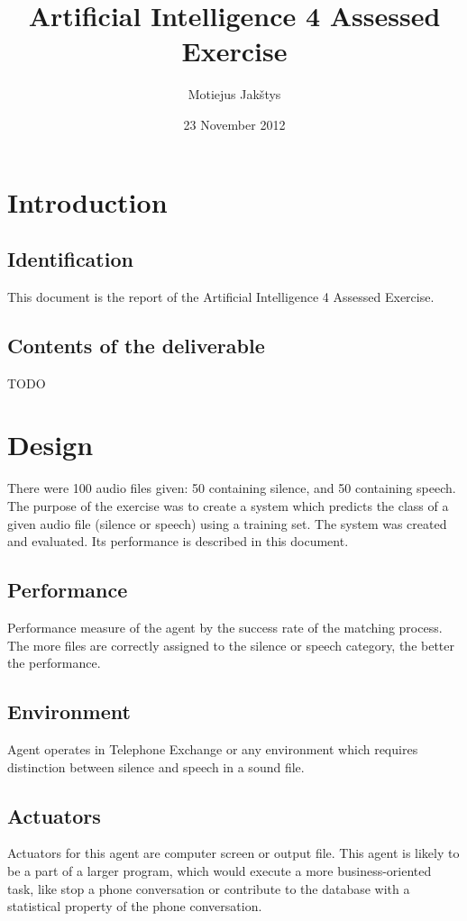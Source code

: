 \documentclass[english,11pt]{article}
\begin{document}
\title{Artificial Intelligence 4 Assessed Exercise}
\author{Motiejus Jakštys}
\date{23 November 2012}

\maketitle
\pagebreak
\tableofcontents
\pagebreak

\section{Introduction}
\subsection{Identification}
This document is the report of the Artificial Intelligence 4 Assessed
Exercise.

\subsection{Contents of the deliverable}

TODO

\section{Design}
There were 100 audio files given: 50 containing silence, and 50 containing
speech. The purpose of the exercise was to create a system which predicts the
class of a given audio file (silence or speech) using a training set. The
system was created and evaluated. Its performance is described in this
document.

\subsection{Performance}
Performance measure of the agent by the success rate of the matching
process. The more files are correctly assigned to the silence or speech
category, the better the performance.

\subsection{Environment}
Agent operates in Telephone Exchange or any environment which requires
distinction between silence and speech in a sound file.

\subsection{Actuators}
Actuators for this agent are computer screen or output file. This agent is
likely to be a part of a larger program, which would execute a more
business-oriented task, like stop a phone conversation or contribute to the
database with a statistical property of the phone conversation.
\end{document}
